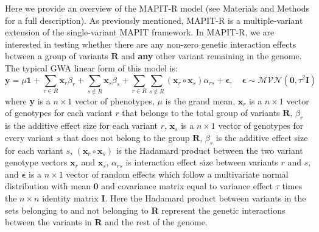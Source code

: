 \documentclass[12pt,a4paper]{article}
\begin{document}
Here we provide an overview of the MAPIT-R model (see Materials and Methods for a full description). As previously mentioned, MAPIT-R is a multiple-variant extension of the single-variant MAPIT framework. In MAPIT-R, we are interested in testing whether there are any non-zero genetic interaction effects between a group of variants $\textbf{R}$ and \textbf{any} other variant remaining in the genome. The typical GWA linear form of this model is:  
\begin{equation}\label{Overview1}
\textbf{y} = \mu\textbf{1} + \sum_{r \in R} \textbf{x}_r\beta_r + \sum_{s \not\in R} \textbf{x}_s\beta_s + \sum_{r \in R}\sum_{s \not\in R} (\textbf{x}_r \circ \textbf{x}_s)\alpha_{rs} + \boldsymbol{\epsilon}, \quad \boldsymbol{\epsilon} \sim \mathcal{MVN}(\textbf{0}, \tau^{2}\textbf{I})  
\end{equation}
where \textbf{y} is a $n \times 1$ vector of phenotypes, $\mu$ is the grand mean, $\textbf{x}_r$ is a $n \times 1$ vector of genotypes for each variant $r$ that belongs to the total group of variants $\textbf{R}$, $\beta_r$ is the additive effect size for each variant $r$, $\textbf{x}_s$ is a $n \times 1$ vector of genotypes for every variant $s$ that does not belong to the group $\textbf{R}$, $\beta_s$ is the additive effect size for each variant $s$, $(\textbf{x}_r \circ \textbf{x}_s)$ is the Hadamard product between the two variant genotype vectors $\textbf{x}_r$ and $\textbf{x}_s$, $\alpha_{rs}$ is interaction effect size between variants $r$ and $s$, and $\boldsymbol{\epsilon}$ is a $n \times 1$ vector of random effects which follow a multivariate normal distribution with mean $\textbf{0}$ and covariance matrix equal to variance effect $\tau$ times the $n \times n$ identity matrix $\textbf{I}$. Here the Hadamard product between variants in the sets belonging to and not belonging to \textbf{R} represent the genetic interactions between the variants in \textbf{R} and the rest of the genome.
\end{document}
